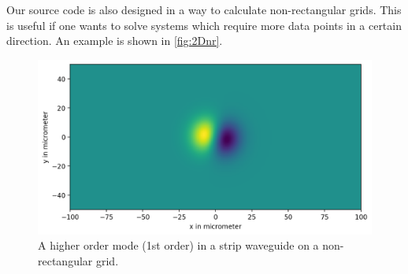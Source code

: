 \documentclass[a4paper,12pt]{scrartcl}
\begin{document}
    Our source code is also designed in a way to calculate non-rectangular grids.
    This is useful if one wants to solve systems which require more data points 
    in a certain direction. An example is shown in \autoref{fig:2Dnr}.
         \begin{figure}[H]
        \centering
        \includegraphics[width=.6\textwidth]{figures/2D-nonrect.png}
        \caption{A higher order mode (1st order) in a strip waveguide on a non-rectangular grid.}
        \label{fig:2Dnr}
    \end{figure}
    
\end{document}
